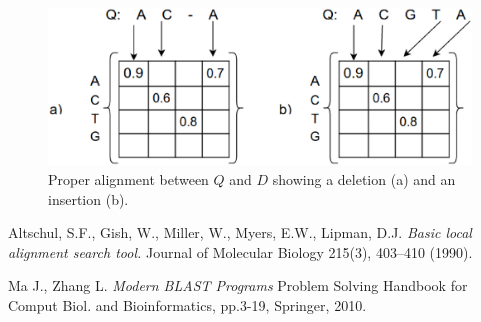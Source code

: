 \documentclass[12pt]{IEEEtran}
\begin{document}
\begin{figure}
    \centering
    \includegraphics[scale=0.5]{indel}
    \caption{Proper alignment between $Q$ and $D$ showing a deletion (a) and an insertion (b).}
    \label{indel}
\end{figure}
\begin{thebibliography}{9}

Altschul, S.F., Gish, W., Miller, W., Myers, E.W., Lipman, D.J. 
\emph{Basic local alignment search tool. }
Journal of Molecular Biology 215(3), 403–410 (1990).

Ma J., Zhang L.
\emph{Modern BLAST Programs}
Problem Solving Handbook for Comput Biol. and Bioinformatics, pp.3-19, Springer, 2010.


\end{thebibliography}
\end{document}
